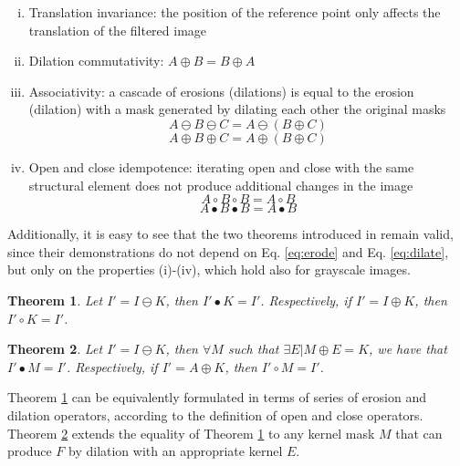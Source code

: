 \documentclass[review]{elsarticle}
\newtheorem{theorem}{Theorem}
\begin{document}
\begin{enumerate}[(i)]
	\item Translation invariance: the position of the reference point only affects the translation of the filtered image
	\item Dilation commutativity: $A\oplus B = B \oplus A$
	\item Associativity: a cascade of erosions (dilations) is equal to the erosion (dilation) with a mask generated by dilating each other the original masks
	\begin{equation}
	A \ominus B \ominus C = A \ominus (B \oplus C)
	\end{equation}
	\begin{equation}
	A \oplus B \oplus C = A \oplus (B \oplus C)
	\end{equation} 
	\item Open and close idempotence: iterating open and close with the same structural element does not produce additional changes in the image
	\begin{equation}
	A \circ B \circ B = A \circ B
	\end{equation}
	\begin{equation}
	A \bullet B \bullet B = A \bullet B
	\end{equation} 
\end{enumerate}

Additionally, it is easy to see that the two theorems introduced in \cite{de2017detecting} remain valid, since their demonstrations do not depend on Eq. \ref{eq:erode} and Eq. \ref{eq:dilate}, but only on the properties (i)-(iv), which hold also for grayscale images.

\begin{theorem}
	\label{theorem_1}
	Let $I' = I \ominus K$, then $I'\bullet K = I'$. Respectively, if $I' = I \oplus K$, then $I'\circ K = I'$.
\end{theorem}

\begin{theorem}
	\label{theorem_2}
	Let $I' = I \ominus K$, then $\forall M$ such that $\exists E | M \oplus E = K$, we have that $I' \bullet M = I'$. Respectively, if $I' = A \oplus K$, then $I' \circ M = I'$.
\end{theorem}

Theorem \ref{theorem_1} can be equivalently formulated in terms of series of erosion and dilation operators, according to the definition of open and close operators. Theorem \ref{theorem_2} extends the equality of Theorem \ref{theorem_1} to any kernel mask $M$ that can produce $F$ by dilation with an appropriate kernel $E$.
\end{document}
